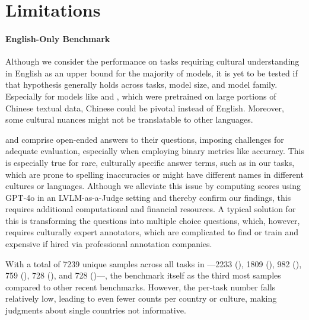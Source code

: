 \newpage
\section*{Limitations}
\label{sec:limitations}
%
\paragraph{English-Only Benchmark}
%
Although we consider the performance on tasks requiring cultural understanding in English as an upper bound for the majority of models, it is yet to be tested if that hypothesis generally holds across tasks, model size, and model family.
%
Especially for models like  and , which were pretrained on large portions of Chinese textual data, Chinese could be pivotal instead of English.
%
Moreover, some cultural nuances might not be translatable to other languages.
%

%
%
\sivqa and \vvqa comprise open-ended answers to their questions, imposing challenges for adequate evaluation, especially when employing binary metrics like accuracy.
%
This is especially true for rare, culturally specific answer terms, such as in our tasks, which are prone to spelling inaccuracies or might have different names in different cultures or languages.
%
Although we alleviate this issue by computing scores using GPT-4o in an LVLM-as-a-Judge setting and thereby confirm our findings, this requires additional computational and financial resources.
%
A typical solution for this is transforming the questions into multiple choice questions, which, however, requires culturally expert annotators, which are complicated to find or train and expensive if hired via professional annotation companies.
%

%
With a total of 7239 unique samples across all tasks in \dsname---2233 (\sivqa), 1809 (\vvqa), 982 (\coqac), 759 (\coqar), 728 (\ckqad), and 728 (\ckqan)---, the benchmark itself as the third most samples compared to other recent benchmarks.
%
However, the per-task number falls relatively low, leading to even fewer counts per country or culture, making judgments about single countries not informative.
%
